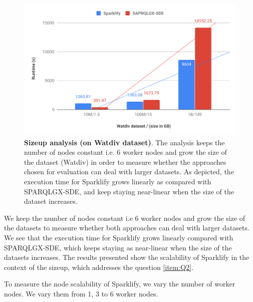 \begin{figure}
 \includegraphics[width=1.0\columnwidth]{images/6_scalable_rdf_querying/sparklify-sizeup-scalability.pdf}
    \caption{\textbf{Sizeup analysis (on Watdiv dataset)}.
    The analysis keeps the number of nodes constant i.e. 6 worker nodes and grow the size of the dataset (Watdiv) in order to measure whether the approaches chosen for evaluation can deal with larger datasets.
    As depicted, the execution time for Sparklify grows linearly as compared with SPARQLGX-SDE, and keep staying near-linear when the size of the dataset increases.}
    \label{fig:sparklify-sizeup-scalability}
\end{figure}

We keep the number of nodes constant i.e 6 worker nodes and grow the size of the datasets to measure whether both approaches can deal with larger datasets.
We see that the execution time for Sparklify grows linearly compared with SPARQLGX-SDE, which keeps staying as near-linear when the size of the datasets increases. 
The results presented show the scalability of Sparklify in the context of the sizeup, which addresses the question \ref{item:Q2}.

To measure the node scalability of Sparklify, we vary the number of worker nodes.
We vary them from 1, 3 to 6 worker nodes.

